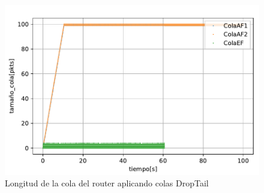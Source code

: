 \begin{figure}[!ht]
    \centering
    \includegraphics{graficas/DropTail/tamanho_cola_droptail.pdf}
    \caption{Longitud de la cola del router aplicando colas DropTail}
    \label{fig:wrr11_tam}
\end{figure}

